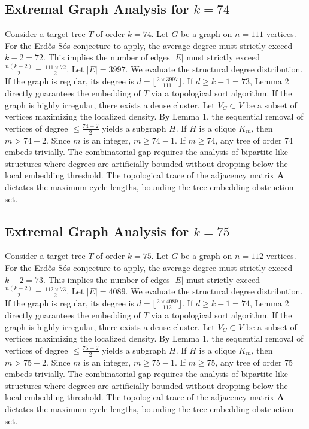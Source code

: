 \documentclass[11pt,a4paper]{article}
\begin{document}
\subsection{Extremal Graph Analysis for $k=74$}
Consider a target tree $T$ of order $k=74$.
Let $G$ be a graph on $n=111$ vertices.
For the Erd\H{o}s-S\'os conjecture to apply, the average degree must strictly exceed $k-2 = 72$.
This implies the number of edges $|E|$ must strictly exceed $\frac{n(k-2)}{2} = \frac{111 \times 72}{2}$.
Let $|E| = 3997$.
We evaluate the structural degree distribution. If the graph is regular, its degree is $d = \lfloor \frac{2 \times 3997}{111} \rfloor$.
If $d \geq k-1 = 73$, Lemma 2 directly guarantees the embedding of $T$ via a topological sort algorithm.
If the graph is highly irregular, there exists a dense cluster. Let $V_C \subset V$ be a subset of vertices maximizing the localized density.
By Lemma 1, the sequential removal of vertices of degree $\leq \frac{74-2}{2}$ yields a subgraph $H$.
If $H$ is a clique $K_{m}$, then $m > 74-2$. Since $m$ is an integer, $m \geq 74-1$. If $m \geq 74$, any tree of order $74$ embeds trivially.
The combinatorial gap requires the analysis of bipartite-like structures where degrees are artificially bounded without dropping below the local embedding threshold. The topological trace of the adjacency matrix $\mathbf{A}$ dictates the maximum cycle lengths, bounding the tree-embedding obstruction set.


\subsection{Extremal Graph Analysis for $k=75$}
Consider a target tree $T$ of order $k=75$.
Let $G$ be a graph on $n=112$ vertices.
For the Erd\H{o}s-S\'os conjecture to apply, the average degree must strictly exceed $k-2 = 73$.
This implies the number of edges $|E|$ must strictly exceed $\frac{n(k-2)}{2} = \frac{112 \times 73}{2}$.
Let $|E| = 4089$.
We evaluate the structural degree distribution. If the graph is regular, its degree is $d = \lfloor \frac{2 \times 4089}{112} \rfloor$.
If $d \geq k-1 = 74$, Lemma 2 directly guarantees the embedding of $T$ via a topological sort algorithm.
If the graph is highly irregular, there exists a dense cluster. Let $V_C \subset V$ be a subset of vertices maximizing the localized density.
By Lemma 1, the sequential removal of vertices of degree $\leq \frac{75-2}{2}$ yields a subgraph $H$.
If $H$ is a clique $K_{m}$, then $m > 75-2$. Since $m$ is an integer, $m \geq 75-1$. If $m \geq 75$, any tree of order $75$ embeds trivially.
The combinatorial gap requires the analysis of bipartite-like structures where degrees are artificially bounded without dropping below the local embedding threshold. The topological trace of the adjacency matrix $\mathbf{A}$ dictates the maximum cycle lengths, bounding the tree-embedding obstruction set.
\end{document}
